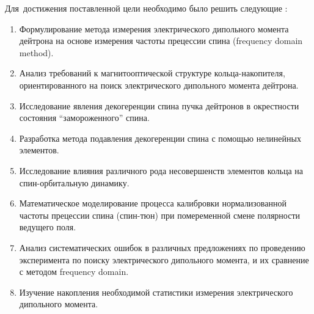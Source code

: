 Для~достижения поставленной цели необходимо было решить следующие {\tasks}:
\begin{enumerate}
	\item Формулирование метода измерения электрического дипольного момента дейтрона на основе измерения частоты прецессии спина (frequency domain method).
	\item Анализ требований к магнитооптической структуре кольца-накопителя, ориентированного на поиск электрического дипольного момента дейтрона.
	\item Исследование явления декогеренции спина пучка дейтронов в окрестности состояния ``замороженного'' спина. 
	\item Разработка метода подавления декогеренции спина с помощью нелинейных элементов.
	\item Исследование влияния различного рода несовершенств элементов кольца на спин-орбитальную динамику. 
	\item Математическое моделирование процесса калибровки нормализованной частоты прецессии спина (спин-тюн) при помеременной смене полярности ведущего поля.
	\item Анализ систематических ошибок в различных предложениях по проведению эксперимента по поиску электрического дипольного момента, и их сравнение с методом frequency domain. 
	\item Изучение накопления необходимой статистики измерения электрического дипольного момента.
\end{enumerate}


